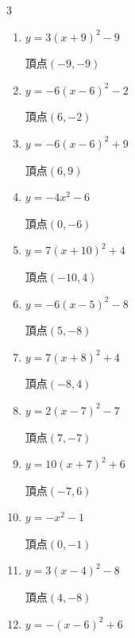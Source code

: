 \begin{multicols}{3}
\begin{enumerate}
  \item $\displaystyle y=3\left( x+9\right)^{2}-9$

        $\displaystyle 頂点\left( -9 , -9 \right)$

  \item $\displaystyle y=-6\left( x-6\right)^{2}-2$

        $\displaystyle 頂点\left( 6 , -2 \right)$

  \item $\displaystyle y=-6\left( x-6\right)^{2}+9$

        $\displaystyle 頂点\left( 6 , 9 \right)$

\columnbreak %

\resetques

  \item $\displaystyle y=-4x^{2}-6$

        $\displaystyle 頂点\left( 0 , -6 \right)$

  \item $\displaystyle y=7\left( x+10\right)^{2}+4$

        $\displaystyle 頂点\left( -10 , 4 \right)$

  \item $\displaystyle y=-6\left( x-5\right)^{2}-8$

        $\displaystyle 頂点\left( 5 , -8 \right)$

  \item $\displaystyle y=7\left( x+8\right)^{2}+4$

        $\displaystyle 頂点\left( -8 , 4 \right)$

  \item $\displaystyle y=2\left( x-7\right)^{2}-7$

        $\displaystyle 頂点\left( 7 , -7 \right)$

  \item $\displaystyle y=10\left( x+7\right)^{2}+6$

        $\displaystyle 頂点\left( -7 , 6 \right)$

  \item $\displaystyle y=-x^{2}-1$

        $\displaystyle 頂点\left( 0 , -1 \right)$

  \item $\displaystyle y=3\left( x-4\right)^{2}-8$

        $\displaystyle 頂点\left( 4 , -8 \right)$

  \item $\displaystyle y=-\left( x-6\right)^{2}+6$


\end{enumerate}
\end{multicols}
